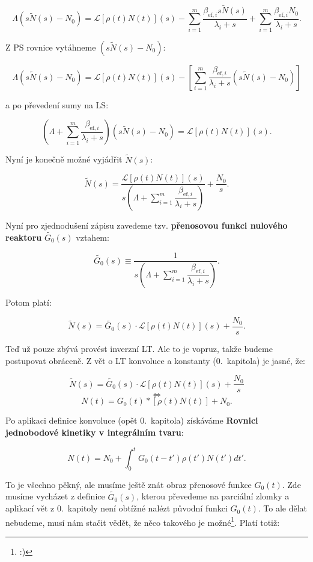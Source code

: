 $$ \Lambda (s \tilde{N}(s) - N_0) = \mathcal{L}[\rho(t) N(t)](s) - \sum_{i=1}^m \dfrac{\beta_{\text{ef},i} s \tilde{N}(s)}{\lambda_i + s} + \sum_{i=1}^m \dfrac{\beta_{\text{ef},i}N_0}{\lambda_i + s}. $$

Z PS rovnice vytáhneme $(s \tilde{N}(s) - N_0)$:

$$ \Lambda (s \tilde{N}(s) - N_0) = \mathcal{L}[\rho(t) N(t)](s) - \left [ \sum_{i=1}^m \dfrac{\beta_{\text{ef},i}}{\lambda_i + s}(s \tilde{N}(s) - N_0) \right ]$$

a po převedení sumy na LS:

$$ \left ( \Lambda + \sum_{i=1}^m \dfrac{\beta_{\text{ef},i}}{\lambda_i + s} \right ) (s \tilde{N}(s) - N_0) = \mathcal{L}[\rho(t) N(t)](s). $$

Nyní je konečně možné vyjádřit $\tilde{N}(s)$:

$$ \tilde{N}(s) = \dfrac{\mathcal{L}[\rho(t) N(t)](s)}{s \left ( \Lambda + \sum_{i=1}^m \dfrac{\beta_{\text{ef},i}}{\lambda_i + s} \right )} + \dfrac{N_0}{s}. $$

Nyní pro zjednodušení zápisu zavedeme tzv. \textbf{přenosovou funkci nulového reaktoru} $\tilde{G_0}(s)$ vztahem:

\begin{equation}
  \boxed{
  \tilde{G_0}(s) \equiv \dfrac{1}{s \left ( \Lambda + \sum_{i=1}^m \dfrac{\beta_{\text{ef},i}}{\lambda_i + s} \right )}.
  \label{prenosova_funkce}
  }
\end{equation}

Potom platí:

$$ \tilde{N}(s) = \tilde{G_0}(s) \cdot \mathcal{L}[\rho(t) N(t)](s) + \dfrac{N_0}{s}. $$

Teď už pouze zbývá provést inverzní LT. Ale to je vopruz, takže budeme postupovat obráceně. Z vět o LT konvoluce a konstanty (0.~kapitola) je jasné, že:

$$ \tilde{N}(s) = \tilde{G_0}(s) \cdot \mathcal{L}[\rho(t) N(t)](s) + \dfrac{N_0}{s} $$
$$ \Leftrightarrow $$
$$ N(t) = G_0(t) * [\rho(t) N(t)] + N_0. $$

Po aplikaci definice konvoluce (opět 0.~kapitola) získáváme \textbf{Rovnici jednobodové kinetiky v integrálním tvaru}:

\begin{equation}
  \boxed{
  N(t) = N_0 + \int_0^t G_0(t-t') \rho(t') N(t')dt'.
  \label{integralni_kinetika}
  }
\end{equation}

To je všechno pěkný, ale musíme ještě znát obraz přenosové funkce $G_0(t)$. Zde musíme vycházet z definice $\tilde{G_0}(s)$, kterou převedeme na parciální zlomky a aplikací vět z 0.~kapitoly není obtížné nalézt původní funkci $G_0(t)$. To ale dělat nebudeme, musí nám stačit vědět, že něco takového je možné\footnote{:)}. Platí totiž:

